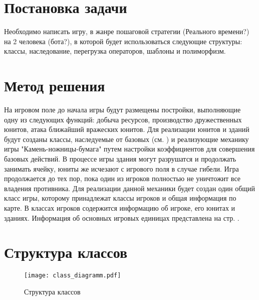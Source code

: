 \documentclass[a4paper,14pt]{article}
\begin{document}


\section{Постановка задачи}

Необходимо написать игру, в жанре пошаговой стратегии (Реального времени?) на 2 человека (бота?), в которой будет использоваться следующие структуры: классы, наследование, перегрузка операторов, шаблоны и полиморфизм. 

\section{Метод решения}

На игровом поле до начала игры будут размещены постройки, выполняющие одну из следующих функций: добыча ресурсов, производство дружественных юнитов, атака ближайший вражеских юнитов. Для реализации юнитов и зданий будут созданы классы, наследуемые от базовых (см. ) и реализующие механику игры "Камень-ножницы-бумага" путем настройки коэффициентов для совершения базовых действий. В процессе игры здания могут разрушатся и продолжать занимать ячейку, юниты же исчезают с игрового поля в случае гибели. Игра продолжается до тех пор, пока один из игроков полностью не уничтожит все владения противника.
Для реализации данной механики будет создан один общий класс игры, которому принадлежат классы игроков и общая информация по карте. В классах игроков содержится информацию об игроке, его юнитах и зданиях. Информация об основных игровых единицах представлена на стр. \pageref{im:UML}.

\section{Структура классов}

\begin{figure}[H]
	\centering
	\caption{Структура классов}
	\texttt{[image: class\_diagramm.pdf]}	
	\label{im:UML}
\end{figure}
\end{document}
